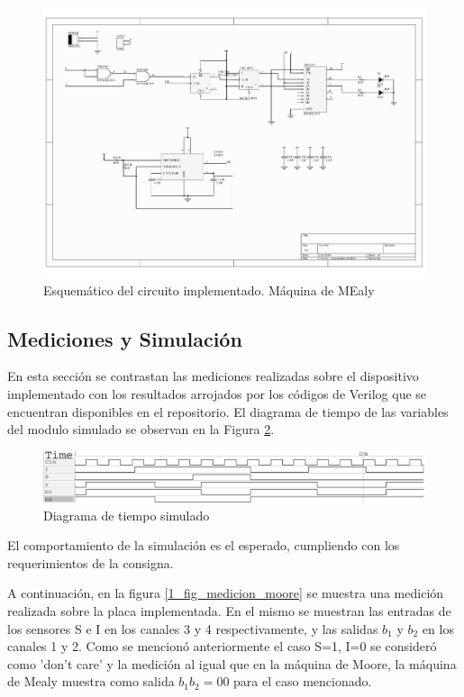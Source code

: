 \documentclass[10pt,a4paper]{article}
\begin{document}
\begin{figure}[ht]
\centering
\includegraphics[scale=0.6]{images/Esquematico_Mealy.pdf}
\caption{Esquemático del circuito implementado. Máquina de MEaly}
\label{1_fig_esqm_mealy}
\end{figure}

\subsection*{Mediciones y Simulación}

En esta sección se contrastan las mediciones realizadas sobre el dispositivo implementado con los resultados arrojados por los códigos de Verilog que se encuentran disponibles en el repositorio. El diagrama de tiempo de las variables del modulo simulado se observan en la Figura \ref{1_fig_verilog_mealy}.


\begin{figure}[H]
\centering
\includegraphics[scale=0.35]{images/time_diagram_mealy}
\caption{Diagrama de tiempo simulado}
\label{1_fig_verilog_mealy}
\end{figure}

El comportamiento de la simulación es el esperado, cumpliendo con los requerimientos de la consigna.

A continuación, en la figura \ref{1_fig_medicion_moore} se muestra una medición realizada sobre la placa implementada. En el mismo se muestran las entradas de los sensores S e I en los canales 3 y 4 respectivamente, y las salidas $b_1$ y $b_2$ en los canales 1 y 2. Como se mencionó anteriormente el caso S=1, I=0 se consideró como 'don't care' y la medición al igual que en la máquina de Moore, la máquina de Mealy muestra como salida $b_1b_2=00$ para el caso mencionado.
\end{document}
